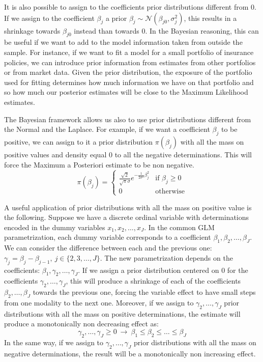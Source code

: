 \documentclass[a4paper, nobind]{templates/ociamthesis}
\theoremstyle{definition}
\theoremstyle{definition}
\theoremstyle{definition}
\theoremstyle{remark}
\begin{document}
It is also possible to assign to the coefficients prior distributions different from \(0\). If we assign to the coefficient \(\beta_j\) a prior \(\beta_j\sim\mathcal{N}(\beta_{j0}, \sigma_j^2)\), this results in a shrinkage towards \(\beta_{j0}\) instead than towards \(0\). In the Bayesian reasoning, this can be useful if we want to add to the model information taken from outside the sample. For instance, if we want to fit a model for a small portfolio of insurance policies, we can introduce prior information from estimates from other portfolios or from market data. Given the prior distribution, the exposure of the portfolio used for fitting determines how much information we have on that portfolio and so how much our posterior estimates will be close to the Maximum Likelihood estimates.

The Bayesian framework allows us also to use prior distributions different from the Normal and the Laplace. For example, if we want a coefficient \(\beta_j\) to be positive, we can assign to it a prior distribution \(\pi(\beta_j)\) with all the mass on positive values and density equal \(0\) to all the negative determinations. This will force the Maximum a Posteriori estimate to be non negative.
\[
\pi(\beta_j) =
\begin{cases}
\frac{\sqrt{2}}{\sqrt{\pi}\sigma}e^{-\frac{1}{2\sigma^2}\beta_j^2} & \text{if } \beta_j \ge 0 \\
0 & \text{otherwise}
\end{cases}
\]

A useful application of prior distributions with all the mass on positive value is the following. Suppose we have a discrete ordinal variable with determinations encoded in the dummy variables \(x_1, x_2, \dots, x_J\). In the common GLM parametrization, each dummy variable corresponds to a coefficient \(\beta_1, \beta_2, \dots, \beta_J\). We can consider the difference between each and the previous one: \(\gamma_j = \beta_j - \beta_{j-1}, \ j\in\{2, 3, \dots, J\}\). The new parametrization depends on the coefficients: \(\beta_1, \gamma_2, \dots, \gamma_J\). If we assign a prior distribution centered on \(0\) for the coefficients \(\gamma_2, \dots, \gamma_J\), this will produce a shrinkage of each of the coefficients \(\beta_2, \dots, \beta_J\) towards the previous one, forcing the variable effect to have small steps from one modality to the next one. Moreover, if we assign to \(\gamma_2, \dots, \gamma_J\) prior distributions with all the mass on positive determinations, the estimate will produce a monotonically non decreasing effect as:
\[
\gamma_2, \dots, \gamma_J \ge 0 \ \longrightarrow \ \beta_1\le\beta_2\le\dots\le\beta_J
\]
In the same way, if we assign to \(\gamma_2, \dots, \gamma_J\) prior distributions with all the mass on negative determinations, the result will be a monotonically non increasing effect.
\end{document}
